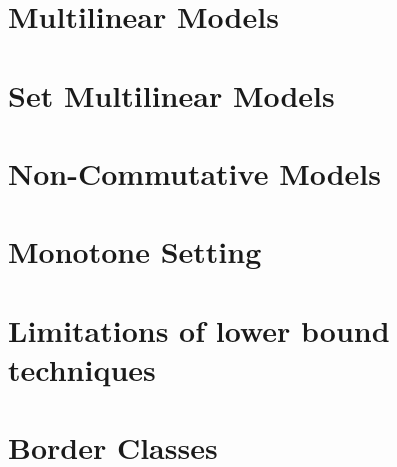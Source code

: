 

\part{Multilinear Models}








\part{Set Multilinear Models}





\part{Non-Commutative Models}








\part{Monotone Setting}







\part{Limitations of lower bound techniques}





\part{Border Classes}


